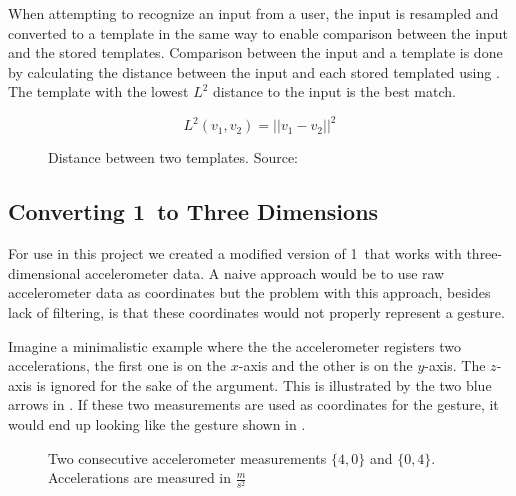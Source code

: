 When attempting to recognize an input from a user, the input is resampled and converted to a template in the same way to enable comparison between the input and the stored templates.
Comparison between the input and a template is done by calculating the distance between the input and each stored templated using .
The template with the lowest $L^2$ distance to the input is the best match.

\begin{figure}[h]
\begin{equation}
L^{2}(v_1, v_2) = \lvert\lvert v_1 - v_2 \rvert\rvert^2
\label{eq:one-cent-l-squared}
\end{equation}
\caption{Distance between two templates. Source: \cite{herold20121}}
\end{figure}

\subsection{Converting 1\textcent~to Three Dimensions}
For use in this project we created a modified version of 1\textcent~that works with three-dimensional accelerometer data.
A naive approach would be to use raw accelerometer data as coordinates but the problem with this approach, besides lack of filtering, is that these coordinates would not properly represent a gesture.

Imagine a minimalistic example where the the accelerometer registers two accelerations, the first one is on the $x$-axis and the other is on the $y$-axis.
The $z$-axis is ignored for the sake of the argument.
This is illustrated by the two blue arrows in .
If these two measurements are used as coordinates for the gesture, it would end up looking like the gesture shown in .

\begin{figure}[h]
\centering
\caption{Two consecutive accelerometer measurements $\{4,0\}$ and $\{0,4\}$. Accelerations are measured in $\frac{m}{s^2}$}
\label{fig:accelerometerpoints}
\end{figure}

